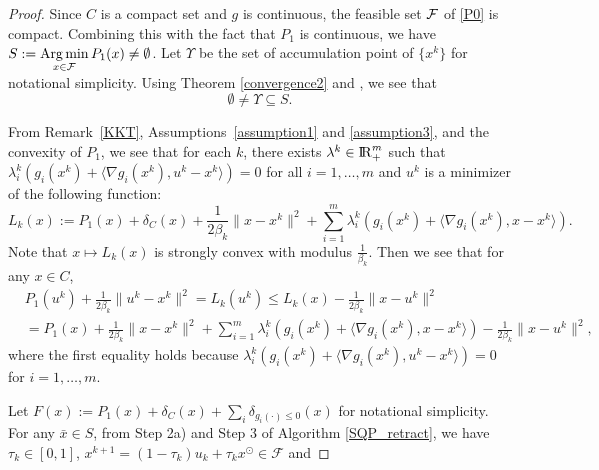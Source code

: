 \documentclass[10pt]{article}
\numberwithin{equation}{section}
\def\R{{\rm I\!R}}
\def\Argmin{\mathop{\rm Arg\,min}}
\def\xfeas{x^\odot}
\begin{document}
\begin{proof}
Since $C$ is a compact set and $g$ is continuous, the feasible set ${\cal F}$ of \eqref{P0} is compact. Combining this with the fact that $P_1$ is continuous, we have $S:= \Argmin\limits_{x\in {\cal F}} P_1(x) \not=\emptyset$. Let $\Upsilon$ be the set of accumulation point of $\{x^k\}$ for notational simplicity. Using Theorem \ref{convergence2} and \cite[Theorem~28.3]{Ro70}, we see that
\[
\emptyset\not=\Upsilon\subseteq S.
\]

From Remark~\ref{KKT}, Assumptions~\ref{assumption1} and \ref{assumption3}, and the convexity of $P_1$, we see that for each $k$, there exists $\lambda^k \in \R^m_+$ such that $\lambda^k_i(g_i(x^k) + \langle \nabla g_i(x^k), u^k - x^k\rangle) = 0$ for all $i = 1, \ldots, m$ and $u^k$ is a minimizer of the following function:
\[
L_k(x):= P_1(x) + \delta_C(x) + \frac{1}{2\beta_k}\|x - x^k\|^2 + \sum\limits_{i = 1}^m\lambda^k_i(g_i(x^k) + \langle \nabla g_i(x^k), x - x^k\rangle).
\]
Note that $x\mapsto L_k(x)$ is strongly convex with modulus $\frac1{\beta_k}$. Then we see that for any $x\in C$,
\begin{equation}\label{lagrange}
\begin{aligned}
&P_1(u^k) + \frac{1}{2\beta_k}\|u^k - x^k\|^2= L_k(u^k)\leq L_k(x) - \frac{1}{2\beta_k}\|x - u^k\|^2\\
&= P_1(x) + \frac{1}{2\beta_k}\|x - x^k\|^2 + \sum\limits_{i = 1}^m\lambda^k_i(g_i(x^k) + \langle \nabla g_i(x^k), x - x^k\rangle) - \frac{1}{2\beta_k}\|x - u^k\|^2,
\end{aligned}
\end{equation}
where the first equality holds because $\lambda^k_i(g_i(x^k) + \langle \nabla g_i(x^k), u^k - x^k\rangle) = 0$ for $i = 1, \ldots, m$.

Let $F(x):= P_1(x) + \delta_C(x) + \sum\limits_i\delta_{g_i(\cdot) \le0}(x)$ for notational simplicity. For any $\bar{x}\in S$, from Step 2a) and Step 3 of Algorithm \ref{SQP_retract}, we have $\tau_k\in[0, 1]$, $x^{k+1} = (1-\tau_k)u_k +\tau_k\xfeas \in \mathcal{F}$ and


\end{proof}
\end{document}
